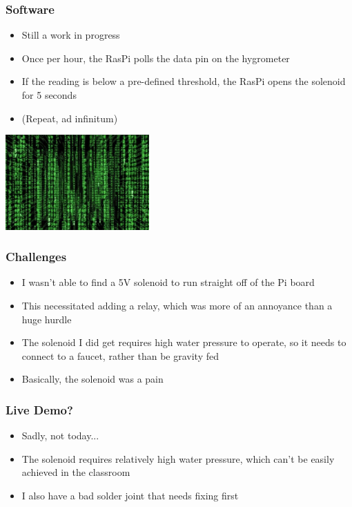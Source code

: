 \documentclass{beamer}
\begin{document}
\begin{frame}
    \frametitle{Software}
    \begin{minipage}{0.52\textwidth}
        \begin{itemize}
            \item Still a work in progress
            \item Once per hour, the RasPi polls the data pin on the hygrometer
            \item If the reading is below a pre-defined threshold, the RasPi opens the
                  solenoid for 5 seconds
            \item (Repeat, ad infinitum)
        \end{itemize}
    \end{minipage}%
    \begin{minipage}{0.45\textwidth}
        \includegraphics[width=5.5cm]{../img/matrix}
    \end{minipage}%
\end{frame}

\begin{frame}
    \frametitle{Challenges}
    \begin{itemize}
        \item I wasn't able to find a 5V solenoid to run straight off of the Pi board
        \item This necessitated adding a relay, which was more of an annoyance than a huge hurdle
        \pause
        \item The solenoid I did get requires high water pressure to operate, so it needs to connect
              to a faucet, rather than be gravity fed
        \pause
        \item Basically, the solenoid was a pain
    \end{itemize}
\end{frame}

\begin{frame}
    \frametitle{Live Demo?}
    \begin{itemize}
        \item Sadly, not today...
        \pause
        \item The solenoid requires relatively high water pressure, which can't
            be easily achieved in the classroom
        \item I also have a bad solder joint that needs fixing first
    \end{itemize}
\end{frame}
\end{document}
